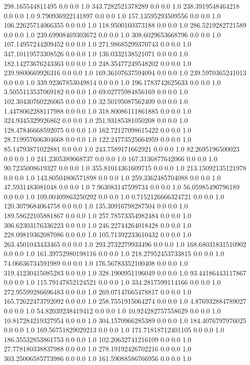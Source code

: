 298.165544811495	0.0	0.0	1.0
343.7282521378289	0.0	0.0	1.0
238.3919548464218	0.0	0.0	1.0
9.790936922141897	0.0	0.0	1.0
157.13595293509556	0.0	0.0	1.0
106.22625714066355	0.0	0.0	1.0
118.9500160373188	0.0	0.0	1.0
286.5219282721589	0.0	0.0	1.0
239.69908469303672	0.0	0.0	1.0
308.6029653668796	0.0	0.0	1.0
107.14957244209452	0.0	0.0	1.0
271.98685299370743	0.0	0.0	1.0
347.10119573308526	0.0	0.0	1.0
136.0332138521071	0.0	0.0	1.0
182.14273676243363	0.0	0.0	1.0
248.35477249548202	0.0	0.0	1.0
239.9800669926316	0.0	0.0	1.0
169.36107637594094	0.0	0.0	1.0
239.5970365241013	0.0	0.0	1.0
339.92367853049814	0.0	0.0	1.0
196.1783742625633	0.0	0.0	1.0
3.5055113537069182	0.0	0.0	1.0
69.02775984856169	0.0	0.0	1.0
102.30430760226065	0.0	0.0	1.0
32.50195087562409	0.0	0.0	1.0
1.4478062288117988	0.0	0.0	1.0
318.80086111861885	0.0	0.0	1.0
324.9345329926862	0.0	0.0	1.0
251.93185381050208	0.0	0.0	1.0
128.47846668592075	0.0	0.0	1.0
162.72127098615422	0.0	0.0	1.0
28.719957606304668	0.0	0.0	1.0
122.24773525664959	0.0	0.0	1.0
85.14793871022881	0.0	0.0	1.0
243.7589171662921	0.0	0.0	1.0
82.2695196500023	0.0	0.0	1.0
241.2305389068737	0.0	0.0	1.0
167.3136877642066	0.0	0.0	1.0
90.7235008619327	0.0	0.0	1.0
355.81014361609715	0.0	0.0	1.0
213.15092135121978	0.0	0.0	1.0
143.80504806571898	0.0	0.0	1.0
259.3362485704088	0.0	0.0	1.0
47.5931483081048	0.0	0.0	1.0
7.963083147599734	0.0	0.0	1.0
56.05985490796189	0.0	0.0	1.0
109.00409863250292	0.0	0.0	1.0
0.7152126666324721	0.0	0.0	1.0
120.3079684064758	0.0	0.0	1.0
135.30916798287504	0.0	0.0	1.0
189.58622105881867	0.0	0.0	1.0
257.78573354982484	0.0	0.0	1.0
306.62303176336223	0.0	0.0	1.0
246.22744264018428	0.0	0.0	1.0
228.09819362087086	0.0	0.0	1.0
105.71392233610432	0.0	0.0	1.0
263.4501043433465	0.0	0.0	1.0
293.2732279933496	0.0	0.0	1.0
168.68031831510902	0.0	0.0	1.0
161.39752980198116	0.0	0.0	1.0
218.27952453733815	0.0	0.0	1.0
74.06636734591989	0.0	0.0	1.0
176.56783352100408	0.0	0.0	1.0
319.41230415085283	0.0	0.0	1.0
328.1900951196049	0.0	0.0	1.0
93.44186443117867	0.0	0.0	1.0
115.79147852124521	0.0	0.0	1.0
334.2817599114166	0.0	0.0	1.0
272.95599286696483	0.0	0.0	1.0
269.07147665478817	0.0	0.0	1.0
165.72622473792092	0.0	0.0	1.0
258.7551915064274	0.0	0.0	1.0
4.876932884789027	0.0	0.0	1.0
54.82039238419412	0.0	0.0	1.0
10.924282757558629	0.0	0.0	1.0
10.817284219327954	0.0	0.0	1.0
304.1570966285389	0.0	0.0	1.0
184.4076797976025	0.0	0.0	1.0
169.56751829029213	0.0	0.0	1.0
171.71818712401105	0.0	0.0	1.0
186.35532853861753	0.0	0.0	1.0
102.20632741216109	0.0	0.0	1.0
27.778180338837988	0.0	0.0	1.0
278.19192426702216	0.0	0.0	1.0
303.25006585773986	0.0	0.0	1.0
161.59088586766956	0.0	0.0	1.0
